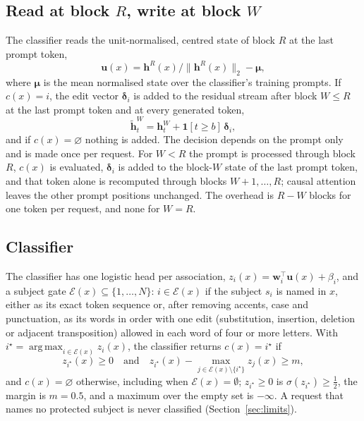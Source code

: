 \documentclass{article}
\theoremstyle{remark}
\theoremstyle{definition}
\newcommand{\ind}{\mathbf{1}}
\DeclareMathOperator*{\argmax}{arg\,max}
\begin{document}
\subsection{Read at block $R$, write at block $W$}
\label{sec:arch}
The classifier reads the unit-normalised, centred state of block $R$ at the last prompt token,
\begin{equation}
 \mathbf u(x)=\mathbf h^R(x)/\|\mathbf h^R(x)\|_2-\boldsymbol\mu ,
 \label{eq:feature}
\end{equation}
where $\boldsymbol\mu$ is the mean normalised state over the classifier's training prompts. If $c(x)=i$, the edit vector $\boldsymbol\delta_i$ is added to the residual stream after block $W\le R$ at the last prompt token and at every generated token,
\begin{equation}
 \tilde{\mathbf h}^W_t=\mathbf h^W_t+\ind[t\ge b]\,\boldsymbol\delta_i ,
 \label{eq:write}
\end{equation}
and if $c(x)=\varnothing$ nothing is added. The decision depends on the prompt only and is made once per request. For $W<R$ the prompt is processed through block $R$, $c(x)$ is evaluated, $\boldsymbol\delta_i$ is added to the block-$W$ state of the last prompt token, and that token alone is recomputed through blocks $W{+}1,\dots,R$; causal attention leaves the other prompt positions unchanged. The overhead is $R-W$ blocks for one token per request, and none for $W=R$.

\subsection{Classifier}
\label{sec:classifier}
The classifier has one logistic head per association, $z_i(x)=\mathbf w_i^\top\mathbf u(x)+\beta_i$, and a subject gate $\mathcal E(x)\subseteq\{1,\dots,N\}$: $i\in\mathcal E(x)$ if the subject $s_i$ is named in $x$, either as its exact token sequence or, after removing accents, case and punctuation, as its words in order with one edit (substitution, insertion, deletion or adjacent transposition) allowed in each word of four or more letters. With $i^\star=\argmax_{i\in\mathcal E(x)}z_i(x)$, the classifier returns $c(x)=i^\star$ if
\begin{equation}
 z_{i^\star}(x)\ge 0\quad\text{and}\quad z_{i^\star}(x)-\max_{j\in\mathcal E(x)\setminus\{i^\star\}}z_j(x)\ge m ,
 \label{eq:classifier}
\end{equation}
and $c(x)=\varnothing$ otherwise, including when $\mathcal E(x)=\emptyset$; $z_{i^\star}\ge 0$ is $\sigma(z_{i^\star})\ge\tfrac12$, the margin is $m=0.5$, and a maximum over the empty set is $-\infty$. A request that names no protected subject is never classified (Section~\ref{sec:limits}).
\end{document}
